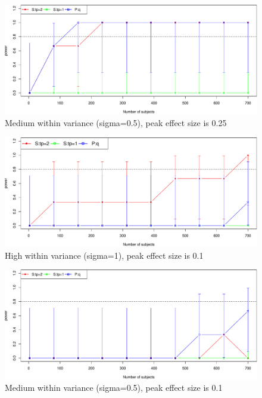 \documentclass[]{article}
\begin{document}
\begin{figure}
\centering
\includegraphics{power_calculations_files/figure-latex/higheffects2-1.pdf}
\caption{Medium within variance (sigma=0.5), peak effect size is 0.25}
\end{figure}

\begin{figure}
\centering
\includegraphics{power_calculations_files/figure-latex/loweffects1-1.pdf}
\caption{High within variance (sigma=1), peak effect size is 0.1}
\end{figure}

\begin{figure}
\centering
\includegraphics{power_calculations_files/figure-latex/loweffects2-1.pdf}
\caption{Medium within variance (sigma=0.5), peak effect size is 0.1}
\end{figure}
\end{document}
